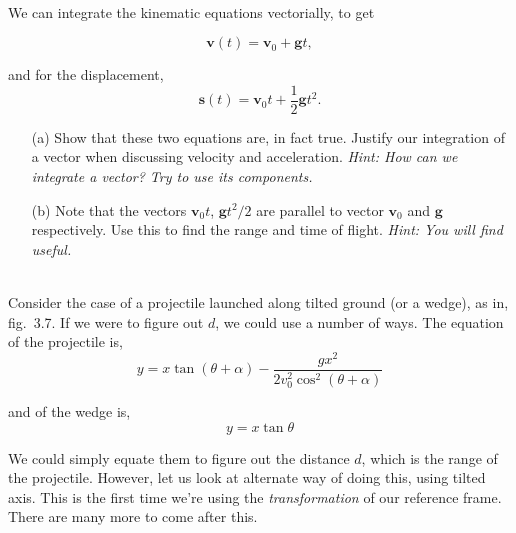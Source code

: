     \begin{exc}
            \begin{exercise}[subtitle={Projectile with Vectors.}, points = 3]
            \\
            We can integrate the kinematic equations vectorially, to get

            \[
            \mathbf{v}(t) = \mathbf{v}_0 + \mathbf{g}t,
            \]
            
            and for the displacement,
            \[
            \mathbf{s}(t) = \mathbf{v}_0 t + \frac{1}{2} \mathbf{g} t^2.
            \]
            
            \begin{enumerate}
                \item[(a)] Show that these two equations are, in fact true. Justify our integration of a vector when 
                discussing velocity and acceleration. \emph{Hint: How can we integrate a vector? Try to use its components.}
            
                \item[(b)] Note that the vectors $\mathbf{v}_0 t$, $\mathbf{g} t^2 / 2$ are parallel to vector $\mathbf{v}_0$ and $\mathbf{g}$ respectively. 
                Use this to find the range and time of flight. \textit{Hint: You will find  useful.}
            \end{enumerate}
        \end{exercise}

        \begin{exercise}[subtitle={Projectile Motion in tilted axes.}, points = 3, ID=projectile-tilted]
            \\
            Consider the case of a projectile launched along tilted ground (or a wedge), as in, fig.~3.7. 
            If we were to figure out $d$, we could use a number of ways. The equation of the projectile is,
            \[
            y = x \tan(\theta + \alpha) - \frac{g x^2}{2 v_0^2 \cos^2(\theta + \alpha)}
            \]

            and of the wedge is,
            \[
            y = x \tan \theta
            \]

            We could simply equate them to figure out the distance $d$, which is the range of the projectile. 
            However, let us look at alternate way of doing this, using tilted axis. This is the first time 
            we're using the \emph{transformation} of our reference frame. There are many more to come after this.


\end{exercise}
\end{exc}
